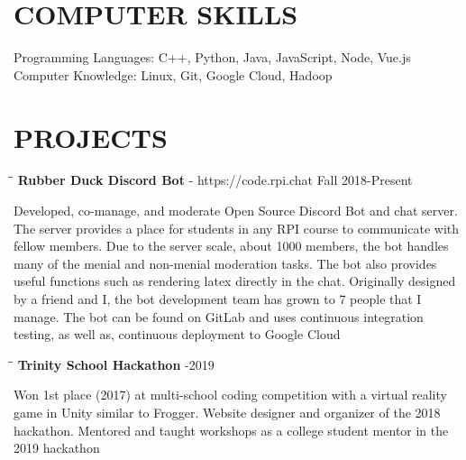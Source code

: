 \documentclass{res}
\begin{document}
\begin{resume}
\vspace{-0.1in}
\section{COMPUTER SKILLS}
    Programming Languages: C++, Python, Java, JavaScript, Node, Vue.js\\
    Computer Knowledge: Linux, Git, Google Cloud, Hadoop

\vspace{-0.1in}
\section{PROJECTS}
	\vspace{-0.1in}
	\begin{tabbing}
   \hspace{2.3in}\= \hspace{3.6in}\= \kill
    {\bf Rubber Duck Discord Bot} - https://code.rpi.chat \>   \>Fall 2018-Present
   \end{tabbing}\vspace{-20pt}
   Developed, co-manage, and moderate Open Source Discord Bot and chat server. The server provides a place for students in any RPI course to communicate with fellow members. Due to the server scale, about 1000 members, the bot handles many of the menial and non-menial moderation tasks. The bot also provides useful functions such as rendering latex directly in the chat. Originally designed by a friend and I, the bot development team has grown to 7 people that I manage. The bot can be found on GitLab and uses continuous integration testing, as well as, continuous deployment to Google Cloud
	\vspace{-15pt}
	\begin{tabbing}
   \hspace{2.3in}\= \hspace{4in}\= \kill
    {\bf Trinity School Hackathon} \>  -2019
   \end{tabbing}\vspace{-20pt}
	Won 1st place (2017) at multi-school coding competition with a virtual reality game in Unity similar to Frogger. Website designer and organizer of the 2018 hackathon. Mentored and taught workshops as a college student mentor in the 2019 hackathon



\end{resume}
\end{document}
